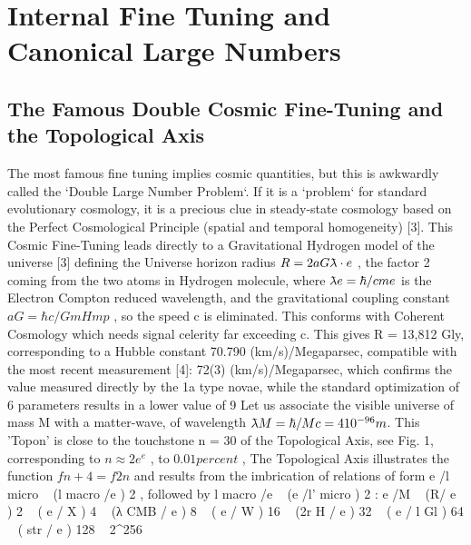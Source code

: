 
\chapter{Internal Fine Tuning and Canonical Large Numbers}
\label{chap:chapter_1}


\section{The Famous Double Cosmic Fine-Tuning and the Topological Axis}
\label{sec:examples}

The most famous fine tuning implies cosmic quantities, but this is awkwardly called the `Double
Large Number Problem`. If it is a `problem` for standard evolutionary cosmology, it is a precious
clue in steady-state cosmology based on the Perfect Cosmological Principle (spatial and temporal
homogeneity) [3].
This Cosmic Fine-Tuning leads directly to a Gravitational Hydrogen model of the universe [3]
defining the Universe horizon radius $R = 2a G \lambdabar \cdot e$ , the factor 2 coming from the two atoms in
Hydrogen molecule, where $\lambdabar e = \hbar/cm e$ is the Electron Compton reduced wavelength, and the
gravitational coupling constant $a G = \hbar c/Gm H m p$ , so the speed c is eliminated. This conforms with
Coherent Cosmology which needs signal celerity far exceeding c. This gives R = 13,812 Gly, corresponding to a Hubble constant 70.790 (km/s)/Megaparsec, compatible with the
most recent measurement [4]: 72(3) (km/s)/Megaparsec, which confirms the value measured
directly by the 1a type novae, while the standard optimization of 6 parameters results in a lower
value of 9 %
Let us associate the visible universe of mass M with a matter-wave, of wavelength $\lambdabar M = \hbar /Mc = 4
10^{-96} m$. This 'Topon' is close to the touchstone n = 30 of the Topological Axis, see Fig. 1,
corresponding to $n ≈ 2e^e$ , to $0.01{percent}$ , The Topological Axis illustrates the function $f{n + 4} = f 2 {n}$
and results from the imbrication of relations of form \lambdabar e /l micro ~ (l macro /\lambdabar e ) 2 , followed by l macro /\lambdabar e ~
(\lambdabar e /l' micro ) 2 :
\lambdabar e /\lambdabar M ~ (R/ \lambdabar e ) 2 ~ ( \lambdabar e / \lambdabar X ) 4 ~ (λ CMB / \lambdabar e ) 8 ~ ( \lambdabar e / \lambdabar W ) 16 ~ (2r H / \lambdabar e ) 32 ~ ( \lambdabar e / l Gl ) 64 ~ ( \lambdabar str / \lambdabar e ) 128 ~ 2^{256}
